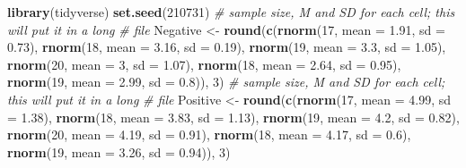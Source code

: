 \documentclass[
  11pt,
]{book}
\newenvironment{Shaded}{\begin{snugshade}}{\end{snugshade}}
\newcommand{\AttributeTok}[1]{\textcolor[rgb]{0.27,0.27,0.27}{#1}}
\newcommand{\CommentTok}[1]{\textcolor[rgb]{0.37,0.37,0.37}{\textit{#1}}}
\newcommand{\DecValTok}[1]{\textcolor[rgb]{0.06,0.06,0.06}{#1}}
\newcommand{\FloatTok}[1]{\textcolor[rgb]{0.06,0.06,0.06}{#1}}
\newcommand{\FunctionTok}[1]{\textcolor[rgb]{0.27,0.27,0.27}{\textbf{#1}}}
\newcommand{\NormalTok}[1]{#1}
\newcommand{\OtherTok}[1]{\textcolor[rgb]{0.37,0.37,0.37}{#1}}
\begin{document}
\begin{Shaded}
\begin{Highlighting}[]
\FunctionTok{library}\NormalTok{(tidyverse)}
\FunctionTok{set.seed}\NormalTok{(}\DecValTok{210731}\NormalTok{)}
\CommentTok{\# sample size, M and SD for each cell; this will put it in a long}
\CommentTok{\# file}
\NormalTok{Negative }\OtherTok{\textless{}{-}} \FunctionTok{round}\NormalTok{(}\FunctionTok{c}\NormalTok{(}\FunctionTok{rnorm}\NormalTok{(}\DecValTok{17}\NormalTok{, }\AttributeTok{mean =} \FloatTok{1.91}\NormalTok{, }\AttributeTok{sd =} \FloatTok{0.73}\NormalTok{), }\FunctionTok{rnorm}\NormalTok{(}\DecValTok{18}\NormalTok{, }\AttributeTok{mean =} \FloatTok{3.16}\NormalTok{,}
    \AttributeTok{sd =} \FloatTok{0.19}\NormalTok{), }\FunctionTok{rnorm}\NormalTok{(}\DecValTok{19}\NormalTok{, }\AttributeTok{mean =} \FloatTok{3.3}\NormalTok{, }\AttributeTok{sd =} \FloatTok{1.05}\NormalTok{), }\FunctionTok{rnorm}\NormalTok{(}\DecValTok{20}\NormalTok{, }\AttributeTok{mean =} \DecValTok{3}\NormalTok{, }\AttributeTok{sd =} \FloatTok{1.07}\NormalTok{),}
    \FunctionTok{rnorm}\NormalTok{(}\DecValTok{18}\NormalTok{, }\AttributeTok{mean =} \FloatTok{2.64}\NormalTok{, }\AttributeTok{sd =} \FloatTok{0.95}\NormalTok{), }\FunctionTok{rnorm}\NormalTok{(}\DecValTok{19}\NormalTok{, }\AttributeTok{mean =} \FloatTok{2.99}\NormalTok{, }\AttributeTok{sd =} \FloatTok{0.8}\NormalTok{)),}
    \DecValTok{3}\NormalTok{)}
\CommentTok{\# sample size, M and SD for each cell; this will put it in a long}
\CommentTok{\# file}
\NormalTok{Positive }\OtherTok{\textless{}{-}} \FunctionTok{round}\NormalTok{(}\FunctionTok{c}\NormalTok{(}\FunctionTok{rnorm}\NormalTok{(}\DecValTok{17}\NormalTok{, }\AttributeTok{mean =} \FloatTok{4.99}\NormalTok{, }\AttributeTok{sd =} \FloatTok{1.38}\NormalTok{), }\FunctionTok{rnorm}\NormalTok{(}\DecValTok{18}\NormalTok{, }\AttributeTok{mean =} \FloatTok{3.83}\NormalTok{,}
    \AttributeTok{sd =} \FloatTok{1.13}\NormalTok{), }\FunctionTok{rnorm}\NormalTok{(}\DecValTok{19}\NormalTok{, }\AttributeTok{mean =} \FloatTok{4.2}\NormalTok{, }\AttributeTok{sd =} \FloatTok{0.82}\NormalTok{), }\FunctionTok{rnorm}\NormalTok{(}\DecValTok{20}\NormalTok{, }\AttributeTok{mean =} \FloatTok{4.19}\NormalTok{,}
    \AttributeTok{sd =} \FloatTok{0.91}\NormalTok{), }\FunctionTok{rnorm}\NormalTok{(}\DecValTok{18}\NormalTok{, }\AttributeTok{mean =} \FloatTok{4.17}\NormalTok{, }\AttributeTok{sd =} \FloatTok{0.6}\NormalTok{), }\FunctionTok{rnorm}\NormalTok{(}\DecValTok{19}\NormalTok{, }\AttributeTok{mean =} \FloatTok{3.26}\NormalTok{,}
    \AttributeTok{sd =} \FloatTok{0.94}\NormalTok{)), }\DecValTok{3}\NormalTok{)}

\end{Highlighting}
\end{Shaded}
\end{document}
